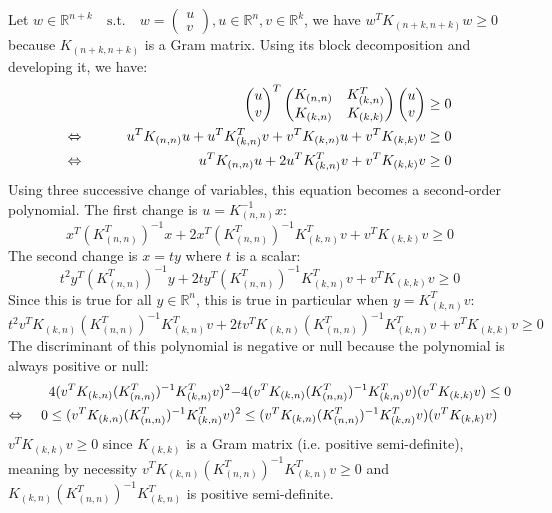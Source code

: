 Let $w \in \mathbb{R}^{n+k} \quad \text{s.t.} \quad w = \begin{pmatrix}
    u \\
    v
  \end{pmatrix}, u \in \mathbb{R}^n, v \in \mathbb{R}^k$, we have $w^T K_{(n+k,n+k)} w \geq 0$ because $K_{(n+k,n+k)}$ is a Gram matrix. Using its block decomposition and developing it, we have:
\begin{alignat*}{2}
  &&\begin{pmatrix}
    u \\
    v
  \end{pmatrix} ^T
  \begin{pmatrix}
    K_{(n,n)} & K_{(k,n)}^T \\
    K_{(k,n)} & K_{(k,k)}
  \end{pmatrix}
  \begin{pmatrix}
    u \\
    v
  \end{pmatrix}
  &\geq 0 \\
  \Leftrightarrow\mkern40mu
  &&u^T K_{(n,n)} u + u^T K_{(k,n)}^T v +
  v^T K_{(k,n)} u + v^T K_{(k,k)} v
  &\geq 0 \\
  \Leftrightarrow\mkern40mu
  &&u^T K_{(n,n)} u + 
  2 u^T K_{(k,n)}^T v +
  v^T K_{(k,k)} v
  &\geq 0
\end{alignat*}
Using three successive change of variables, this equation becomes a second-order polynomial. The first change is $u = K_{(n,n)}^{-1} x$:
\begin{equation*}
  x^T (K_{(n,n)}^T)^{-1} x + 
  2 x^T (K_{(n,n)}^T)^{-1} K_{(k,n)}^T v +
  v^T K_{(k,k)} v
  \geq 0
\end{equation*}
The second change is $x = t y$ where $t$ is a scalar:
\begin{equation*}
  t^2 y^T (K_{(n,n)}^T)^{-1} y + 
  2 t y^T (K_{(n,n)}^T)^{-1} K_{(k,n)}^T v +
  v^T K_{(k,k)} v
  \geq 0
\end{equation*}
Since this is true for all $y \in \mathbb{R}^n$, this is true in particular when $y = K_{(k,n)}^T v$:
\begin{equation*}
  t^2 v^T K_{(k,n)} (K_{(n,n)}^T)^{-1} K_{(k,n)}^T v + 
  2 t v^T K_{(k,n)} (K_{(n,n)}^T)^{-1} K_{(k,n)}^T v +
  v^T K_{(k,k)} v
  \geq 0
\end{equation*}
The discriminant of this polynomial is negative or null because the polynomial is always positive or null:
\begin{align*}
  4 (v^T K_{(k,n)} (K_{(n,n)}^T)^{-1} K_{(k,n)}^T v)^2 -
  &4 (v^T K_{(k,n)} (K_{(n,n)}^T)^{-1} K_{(k,n)}^T v)
  (v^T K_{(k,k)} v)
  \leq 0 \\
  \Leftrightarrow\mkern20mu
  0 \leq (v^T K_{(k,n)} (K_{(n,n)}^T)^{-1} K_{(k,n)}^T v)^2
  &\leq 
  (v^T K_{(k,n)} (K_{(n,n)}^T)^{-1} K_{(k,n)}^T v)
  (v^T K_{(k,k)} v)
\end{align*}
$v^T K_{(k,k)} v \geq 0$ since $ K_{(k,k)}$ is a Gram matrix (i.e. positive semi-definite), meaning by necessity $v^T K_{(k,n)} (K_{(n,n)}^T)^{-1} K_{(k,n)}^T v \geq 0$ and $K_{(k,n)} (K_{(n,n)}^T)^{-1} K_{(k,n)}^T$ is positive semi-definite.

